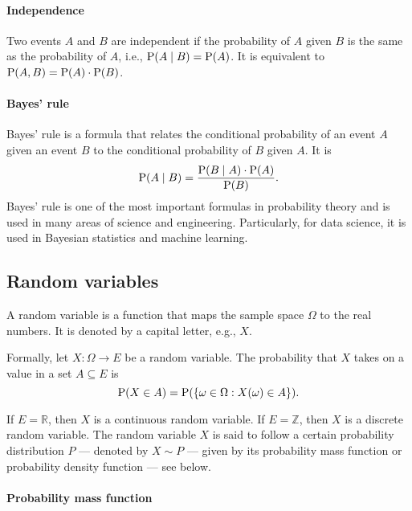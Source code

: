 \paragraph{Independence}

Two events $A$ and $B$ are independent if the probability of $A$ given $B$ is the
same as the probability of $A$, i.e., $\operatorname{P}(A \mid B) = \operatorname{P}(A)$.  It is equivalent to
$\operatorname{P}(A, B) = \operatorname{P}(A) \cdot \operatorname{P}(B)$.

\paragraph{Bayes' rule}

Bayes' rule is a formula that relates the conditional probability of an event $A$
given an event $B$ to the conditional probability of $B$ given $A$.  It is
\begin{equation}
  \label{eq:bayes}
  \operatorname{P}(A \mid B) = \frac{\operatorname{P}(B \mid A) \cdot \operatorname{P}(A)}{\operatorname{P}(B)}\text{.}
\end{equation}
Bayes' rule is one of the most important formulas in probability theory and is used
in many areas of science and engineering.  Particularly, for data science, it is
used in Bayesian statistics and machine learning.

\subsection{Random variables}

A random variable is a function that maps the sample space $\Omega$ to the real
numbers.  It is denoted by a capital letter, e.g., $X$.

Formally, let $X : \Omega \rightarrow E$ be a random variable.  The
probability that $X$ takes on a value in a set $A \subseteq E$ is
\begin{equation}
  \label{eq:rv}
  \operatorname{P}(X \in A) = \operatorname{P}(\{\omega \in \Omega : X(\omega) \in A\})\text{.}
\end{equation}

If $E = \mathbb{R}$, then $X$ is a continuous random variable.  If $E = \mathbb{Z}$,
then $X$ is a discrete random variable.  The random variable $X$ is said to follow
a certain probability distribution $P$ --- denoted by $X \sim P$ --- given by its
probability mass function or probability density function --- see below.

\paragraph{Probability mass function}

